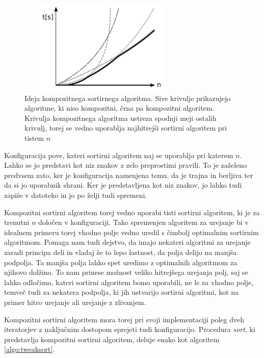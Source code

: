 \documentclass[a4paper,oneside,12pt]{article}
\begin{document}
\begin{figure}[h]
    \begin{center}
        \includegraphics[width=80mm,height=45mm]{slike/tweaksortidea.pdf}
    \end{center}
    \vspace{-0.7cm}
    \caption[Ideja kompozitnega sortirnega algoritma.]{Ideja kompozitnega sortirnega algoritma.
    Sive krivulje prikazujejo algoritme, ki niso kompozitni, črna pa kompozitni algoritem.
    Krivulja kompozitnega algoritma ustreza spodnji meji ostalih krivulj, torej se vedno uporablja 
    najhitrejši sortirni algoritem pri tistem $n$}
    \label{fig:tweaksortidea}
\end{figure}

Konfiguracija pove, kateri sortirni algoritem naj se uporablja pri
katerem $n$. Lahko se jo predstavi kot niz znakov z zelo preprostimi
pravili. To je zaželeno predvsem zato, ker je konfiguracija namenjena temu, da je trajna
in berljiva ter da si jo uporabnik shrani. Ker je predstavljena kot niz
znakov, jo lahko tudi zapiše v datoteko in jo po želji tudi spremeni.

Kompozitni sortirni algoritem torej vedno uporabi tisti sortirni algoritem, ki je za  
trenutni $n$ določen v konfiguraciji. Tako spremenjen algoritem za urejanje bi v idealnem
primeru torej vhodno polje vedno uredil s čimbolj optimalnim sortirnim algoritmom.
Pomaga nam tudi dejstvo, da imajo nekateri algoritmi za urejanje zaradi principa deli in vladaj
še to lepo lastnost, da polja delijo na manjša podpolja. Ta manjša polja lahko spet
uredimo z optimalnih algoritmom za njihovo dolžino. To nam prinese možnost veliko hitrejšega
urejanja polj, saj se lahko odločimo, kateri sortirni algoritem bomo
uporabili, ne le za vhodno polje, temveč tudi za nekatera podpolja, ki jih ustvarijo
sortirni algoritmi, kot na primer hitro urejanje ali urejanje z zlivanjem.

Kompozitni sortirni algoritem mora torej pri svoji implementaciji poleg dveh 
iteratorjev z naključnim dostopom sprejeti tudi konfiguracijo. Procedura \emph{sort},
ki predstavlja kompozitni sortirni algoritem, deluje enako kot algoritem
\ref{algo:tweaksort}. 
\end{document}
